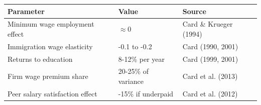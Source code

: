 \begin{tcolorbox}[colback=yellow!10!white, colframe=orange!75!black, title=Quick Reference: Key Card Parameters]
\begin{tabular}{lll}
\textbf{Parameter} & \textbf{Value} & \textbf{Source} \\
\hline
Minimum wage employment effect & $\approx 0$ & Card \& Krueger (1994) \\
Immigration wage elasticity & -0.1 to -0.2 & Card (1990, 2001) \\
Returns to education & 8-12\% per year & Card (1999, 2001) \\
Firm wage premium share & 20-25\% of variance & Card et al. (2013) \\
Peer salary satisfaction effect & -15\% if underpaid & Card et al. (2012) \\
\end{tabular}
\end{tcolorbox}


